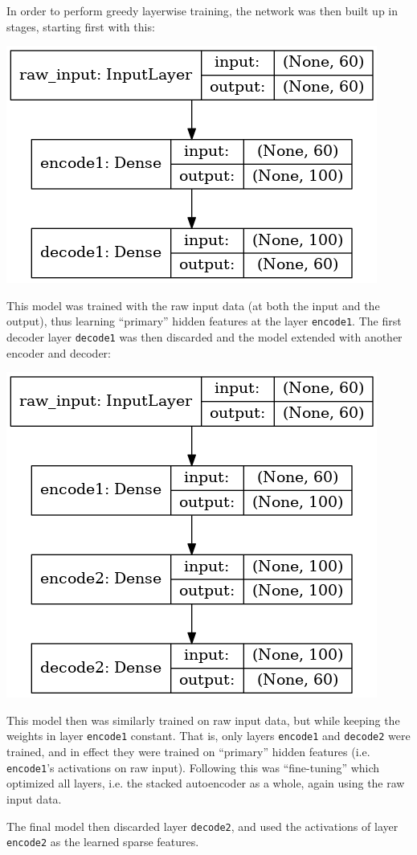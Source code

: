 \documentclass[journal]{IEEEtran}
\begin{document}
In order to perform greedy layerwise training\cite{Ng}, the network
was then built up in stages, starting first with this:

\includegraphics[width=0.7\linewidth]{keras_autoencoder1.png}

This model was trained with the raw input data (at both the input and
the output), thus learning ``primary'' hidden features at the layer
\texttt{encode1}.  The first decoder layer \texttt{decode1} was then
discarded and the model extended with another encoder and decoder:

\includegraphics[width=0.7\linewidth]{keras_autoencoder2.png}

This model then was similarly trained on raw input data, but while
keeping the weights in layer \texttt{encode1} constant.  That is, only
layers \texttt{encode1} and \texttt{decode2} were trained, and in
effect they were trained on ``primary'' hidden features
(i.e. \texttt{encode1}'s activations on raw input).  Following this
was ``fine-tuning''\cite{Ng} which optimized all layers, i.e. the
stacked autoencoder as a whole, again using the raw input data.

The final model then discarded layer \texttt{decode2}, and used the
activations of layer \texttt{encode2} as the learned sparse features.
\end{document}
